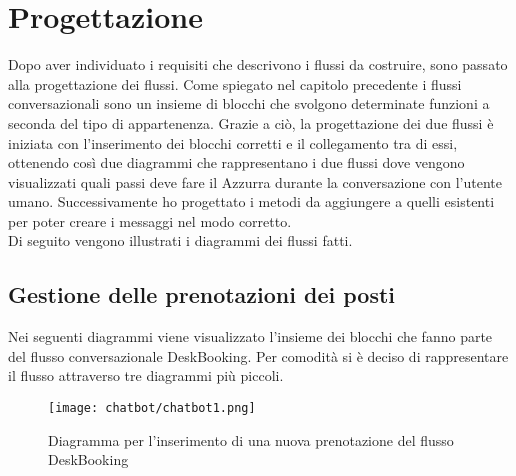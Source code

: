 \section{Progettazione}
Dopo aver individuato i requisiti che descrivono i flussi da costruire, sono passato alla progettazione dei flussi. Come spiegato nel capitolo precedente i flussi conversazionali sono un insieme di blocchi che svolgono determinate funzioni a seconda del tipo di appartenenza. Grazie a ciò, la progettazione dei due flussi è iniziata con l'inserimento dei blocchi corretti e il collegamento tra di essi, ottenendo così due diagrammi che rappresentano i due flussi dove vengono visualizzati quali passi deve fare il  Azzurra durante la conversazione con l'utente umano. Successivamente ho progettato i metodi da aggiungere a quelli esistenti per poter creare i messaggi nel modo corretto.\\
Di seguito vengono illustrati i diagrammi dei flussi fatti.

\subsection{Gestione delle prenotazioni dei posti}
Nei seguenti diagrammi viene visualizzato l'insieme dei blocchi che fanno parte del flusso conversazionale DeskBooking. Per comodità si è deciso di rappresentare il flusso attraverso tre diagrammi più piccoli.

\begin{figure}[h]
	\centering
	\texttt{[image: chatbot/chatbot1.png]}
	\caption{Diagramma per l'inserimento di una nuova prenotazione del flusso DeskBooking}\label{fig:ins}
\end{figure}

